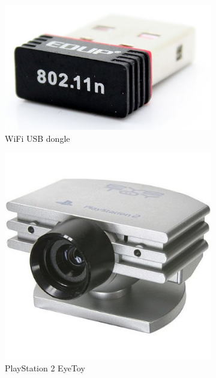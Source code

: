 		\begin{figure}[H]
		    \centering
		    \begin{subfigure}[b]{0.3\textwidth}
		        \centering
		        \includegraphics[scale=0.25]{images/ProjectComponents/wifi.jpg}
				\caption{WiFi USB dongle}
		        \label{}
		    \end{subfigure}
		    \hfill
		    \begin{subfigure}[b]{0.3\textwidth}
		        \centering
		        \includegraphics[scale=0.25]{images/ProjectComponents/camera.jpg}
				\caption{PlayStation 2 EyeToy }
		        \label{}
		    \end{subfigure}
		    \hfill
		    \begin{subfigure}[b]{0.3\textwidth}
		        \centering

\end{subfigure}
\end{figure}
